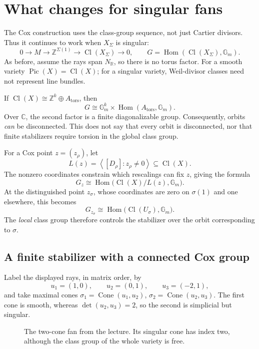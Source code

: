 \documentclass[11pt]{article}
\theoremstyle{definition}
\theoremstyle{remark}
\DeclareMathOperator{\Cl}{Cl}
\DeclareMathOperator{\Pic}{Pic}
\DeclareMathOperator{\Hom}{Hom}
\newcommand{\C}{\mathbb C}
\newcommand{\Z}{\mathbb Z}
\newcommand{\R}{\mathbb R}
\newcommand{\Gm}{\mathbb G_m}
\newcommand{\Cone}[1]{\operatorname{Cone}(#1)}
\begin{document}
\section{What changes for singular fans}
\label{sec:nov02-singular}

The Cox construction uses the class-group sequence, not just Cartier
divisors. Thus it continues to work when \(X_\Sigma\) is singular:
\[
0\longrightarrow M\longrightarrow\Z^{\Sigma(1)}
\longrightarrow\Cl(X_\Sigma)\longrightarrow0,
\qquad
G=\Hom(\Cl(X_\Sigma),\Gm).
\]
As before, assume the rays span \(N_\R\), so there is no torus factor.
For a smooth variety \(\Pic(X)=\Cl(X)\); for a singular variety,
Weil-divisor classes need not represent line bundles.

If \(\Cl(X)\cong\Z^k\oplus A_{\mathrm{tors}}\), then
\[
G\cong\Gm^k\times\Hom(A_{\mathrm{tors}},\Gm).
\]
Over \(\C\), the second factor is a finite diagonalizable group.
Consequently, orbits \emph{can} be disconnected. This does not say
that every orbit is disconnected, nor that finite stabilizers require
torsion in the global class group.

For a Cox point \(z=(z_\rho)\), let
\[
L(z)=\left\langle[D_\rho]:z_\rho\ne0\right\rangle
\subseteq\Cl(X).
\]
The nonzero coordinates constrain which rescalings can fix \(z\),
giving the formula
\[
\boxed{G_z\cong\Hom\bigl(\Cl(X)/L(z),\Gm\bigr).}
\]
At the distinguished point \(z_\sigma\), whose coordinates are zero
on \(\sigma(1)\) and one elsewhere, this becomes
\[
G_{z_\sigma}\cong\Hom\bigl(\Cl(U_\sigma),\Gm\bigr).
\]
The \emph{local} class group therefore controls the stabilizer over
the orbit corresponding to \(\sigma\).

\subsection{A finite stabilizer with a connected Cox group}

Label the displayed rays, in matrix order, by
\[
u_1=(1,0),\qquad u_2=(0,1),\qquad u_3=(-2,1),
\]
and take maximal cones
\(\sigma_1=\Cone{u_1,u_2}\), \(\sigma_2=\Cone{u_2,u_3}\).
The first cone is smooth, whereas
\(\det(u_2,u_3)=2\), so the second is simplicial but singular.

\begin{figure}[htbp]
\centering
{}
\caption{The two-cone fan from the lecture. Its singular cone has
index two, although the class group of the whole variety is free.}
\label{fig:nov02-finite-stabilizer-fan}
\end{figure}
\end{document}
